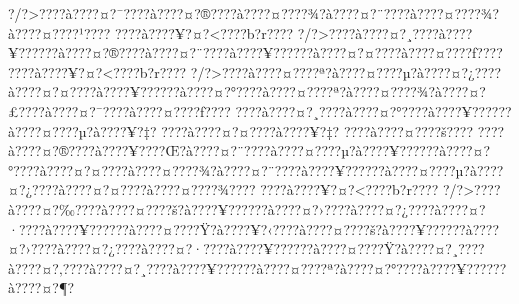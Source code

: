 \documentclass[11pt, openany]{book}
\begin{document}
?/?\textgreater{}???\textbar{}?à???\textbar{}?¤?¯???\textbar{}?à???\textbar{}?¤?®???\textbar{}?à???\textbar{}?¤???\textbar{}?¾?à???\textbar{}?¤?¨???\textbar{}?à???\textbar{}?¤???\textbar{}?¾?à???\textbar{}?¤???\textbar{}?¹???\textbar{}?
???\textbar{}?à???\textbar{}?¥?¤?\textless{}???\textbar{}?b?r???\textbar{}?
?/?\textgreater{}???\textbar{}?à???\textbar{}?¤?¸???\textbar{}?à???\textbar{}?¥?????\textbar{}?à???\textbar{}?¤?®???\textbar{}?à???\textbar{}?¤?¨???\textbar{}?à???\textbar{}?¥?????\textbar{}?à???\textbar{}?¤?¤???\textbar{}?à???\textbar{}?¤???\textbar{}?ƒ???\textbar{}?
???\textbar{}?à???\textbar{}?¥?¤?\textless{}???\textbar{}?b?r???\textbar{}?
?/?\textgreater{}???\textbar{}?à???\textbar{}?¤???\textbar{}?ª?à???\textbar{}?¤???\textbar{}?µ?à???\textbar{}?¤?¿???\textbar{}?à???\textbar{}?¤?¤???\textbar{}?à???\textbar{}?¥?????\textbar{}?à???\textbar{}?¤?°???\textbar{}?à???\textbar{}?¤???\textbar{}?ª?à???\textbar{}?¤???\textbar{}?¾?à???\textbar{}?¤?£???\textbar{}?à???\textbar{}?¤?¯???\textbar{}?à???\textbar{}?¤???\textbar{}?ƒ???\textbar{}?
???\textbar{}?à???\textbar{}?¤?¸???\textbar{}?à???\textbar{}?¤?°???\textbar{}?à???\textbar{}?¥?????\textbar{}?à???\textbar{}?¤???\textbar{}?µ?à???\textbar{}?¥?‡?
???\textbar{}?à???\textbar{}?¤?¤???\textbar{}?à???\textbar{}?¥?‡?
???\textbar{}?à???\textbar{}?¤???\textbar{}?š???\textbar{}?
???\textbar{}?à???\textbar{}?¤?®???\textbar{}?à???\textbar{}?¥???\textbar{}?Œ?à???\textbar{}?¤?¨???\textbar{}?à???\textbar{}?¤???\textbar{}?µ?à???\textbar{}?¥?????\textbar{}?à???\textbar{}?¤?°???\textbar{}?à???\textbar{}?¤?¤???\textbar{}?à???\textbar{}?¤???\textbar{}?¾?à???\textbar{}?¤?¨???\textbar{}?à???\textbar{}?¥?????\textbar{}?à???\textbar{}?¤???\textbar{}?µ?à???\textbar{}?¤?¿???\textbar{}?à???\textbar{}?¤?¤???\textbar{}?à???\textbar{}?¤???\textbar{}?¾???\textbar{}?
???\textbar{}?à???\textbar{}?¥?¤?\textless{}???\textbar{}?b?r???\textbar{}?
?/?\textgreater{}???\textbar{}?à???\textbar{}?¤?‰???\textbar{}?à???\textbar{}?¤???\textbar{}?š?à???\textbar{}?¥?????\textbar{}?à???\textbar{}?¤?›???\textbar{}?à???\textbar{}?¤?¿???\textbar{}?à???\textbar{}?¤?·???\textbar{}?à???\textbar{}?¥?????\textbar{}?à???\textbar{}?¤???\textbar{}?Ÿ?à???\textbar{}?¥?‹???\textbar{}?à???\textbar{}?¤???\textbar{}?š?à???\textbar{}?¥?????\textbar{}?à???\textbar{}?¤?›???\textbar{}?à???\textbar{}?¤?¿???\textbar{}?à???\textbar{}?¤?·???\textbar{}?à???\textbar{}?¥?????\textbar{}?à???\textbar{}?¤???\textbar{}?Ÿ?à???\textbar{}?¤?¸???\textbar{}?à???\textbar{}?¤?‚???\textbar{}?à???\textbar{}?¤?¸???\textbar{}?à???\textbar{}?¥?????\textbar{}?à???\textbar{}?¤???\textbar{}?ª?à???\textbar{}?¤?°???\textbar{}?à???\textbar{}?¥?????\textbar{}?à???\textbar{}?¤?¶?
\end{document}
